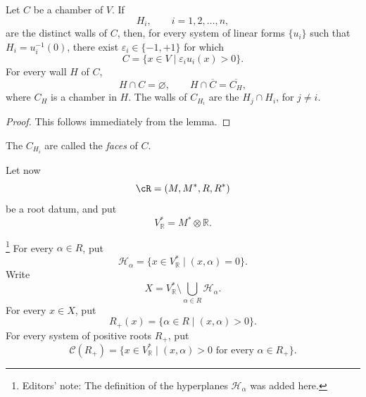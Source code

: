 \begin{proposition}\label{sga3:XXI:3.6.6}
Let \(C\) be a chamber of \(V\). If
\[
 H_i,\qquad i=1,2,\ldots,n,
\]
are the distinct walls of \(C\), then, for every system of linear
forms \(\{u_i\}\) such that \(H_i=u_i^{-1}(0)\), there exist
\(\varepsilon_i\in\{-1,+1\}\) for which
\[
 C=\{x\in V\mid\varepsilon_i u_i(x)>0\}.
\]
For every wall \(H\) of \(C\),
\[
 H\cap C=\varnothing,
 \qquad
 H\cap\overline C=\overline{C_H},
\]
where \(C_H\) is a chamber in \(H\). The walls of \(C_{H_i}\) are
the \(H_j\cap H_i\), for \(j\ne i\).
\end{proposition}

\begin{proof}
This follows immediately from the lemma.
\end{proof}

\begin{definition}\label{sga3:XXI:3.6.7}
The \(C_{H_i}\) are called the \emph{faces} of \(C\).
\end{definition}

Let now
\[
 \cR=(M,M^\ast,R,R^\ast)
\]
be a root datum, and put
\[
 V_{\mathbb{R}}^\ast=M^\ast\otimes\mathbb{R}.
\]

\begin{definition}\label{sga3:XXI:3.6.8}
\footnote{Editors' note: The definition of the hyperplanes
\(\mathcal{H}_\alpha\) was added here.}
For every \(\alpha\in R\), put
\[
 \mathcal{H}_\alpha
   =\{x\in V_{\mathbb{R}}^\ast\mid(x,\alpha)=0\}.
\]
Write
\[
 X=V_{\mathbb{R}}^\ast
   \setminus\bigcup_{\alpha\in R}\mathcal{H}_\alpha.
\]
For every \(x\in X\), put
\[
 R_+(x)=\{\alpha\in R\mid(x,\alpha)>0\}.
\]
For every system of positive roots \(R_+\), put
\[
 \mathcal{C}(R_+)
   =\{x\in V_{\mathbb{R}}^\ast
       \mid (x,\alpha)>0\text{ for every }\alpha\in R_+\}.
\]
\end{definition}


